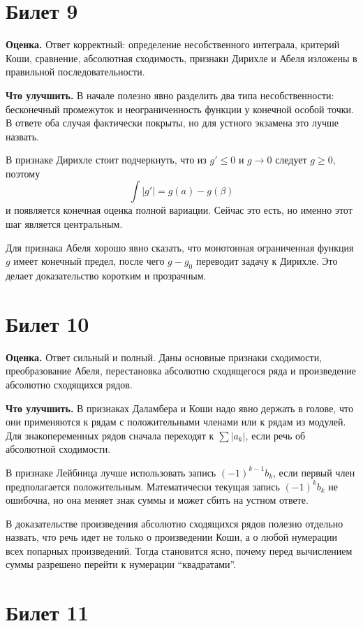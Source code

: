 \documentclass[12pt,a4paper]{article}
\begin{document}
\section*{Билет 9}

\textbf{Оценка.} Ответ корректный: определение несобственного интеграла,
критерий Коши, сравнение, абсолютная сходимость, признаки Дирихле и Абеля
изложены в правильной последовательности.

\textbf{Что улучшить.}
В начале полезно явно разделить два типа несобственности: бесконечный
промежуток и неограниченность функции у конечной особой точки. В ответе оба
случая фактически покрыты, но для устного экзамена это лучше назвать.

В признаке Дирихле стоит подчеркнуть, что из \(g'\le0\) и \(g\to0\) следует
\(g\ge0\), поэтому
\[
  \int |g'|=g(a)-g(\beta)
\]
и появляется конечная оценка полной вариации. Сейчас это есть, но именно этот
шаг является центральным.

Для признака Абеля хорошо явно сказать, что монотонная ограниченная функция
\(g\) имеет конечный предел, после чего \(g-g_0\) переводит задачу к
Дирихле. Это делает доказательство коротким и прозрачным.

\section*{Билет 10}

\textbf{Оценка.} Ответ сильный и полный. Даны основные признаки сходимости,
преобразование Абеля, перестановка абсолютно сходящегося ряда и произведение
абсолютно сходящихся рядов.

\textbf{Что улучшить.}
В признаках Даламбера и Коши надо явно держать в голове, что они применяются
к рядам с положительными членами или к рядам из модулей. Для знакопеременных
рядов сначала переходят к \(\sum |a_k|\), если речь об абсолютной сходимости.

В признаке Лейбница лучше использовать запись \((-1)^{k-1}b_k\), если первый
член предполагается положительным. Математически текущая запись
\((-1)^k b_k\) не ошибочна, но она меняет знак суммы и может сбить на устном
ответе.

В доказательстве произведения абсолютно сходящихся рядов полезно отдельно
назвать, что речь идет не только о произведении Коши, а о любой нумерации
всех попарных произведений. Тогда становится ясно, почему перед вычислением
суммы разрешено перейти к нумерации ``квадратами''.

\section*{Билет 11}
\end{document}

